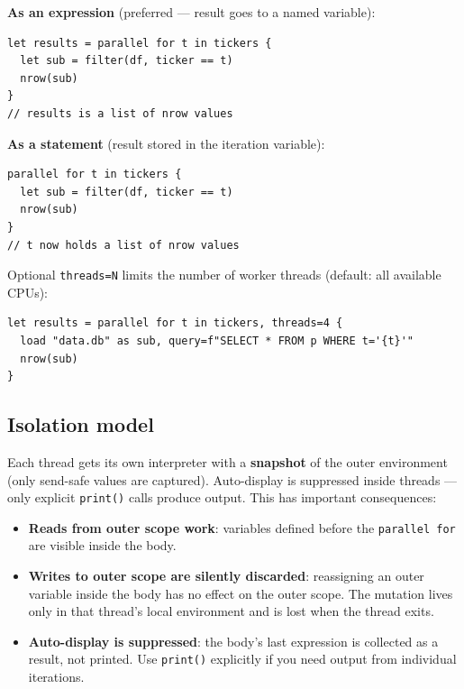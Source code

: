 \textbf{As an expression} (preferred --- result goes to a named variable):

\begin{lstlisting}[caption={parallel for as expression}]
let results = parallel for t in tickers {
  let sub = filter(df, ticker == t)
  nrow(sub)
}
// results is a list of nrow values
\end{lstlisting}

\textbf{As a statement} (result stored in the iteration variable):

\begin{lstlisting}[caption={parallel for as statement}]
parallel for t in tickers {
  let sub = filter(df, ticker == t)
  nrow(sub)
}
// t now holds a list of nrow values
\end{lstlisting}

Optional \texttt{threads=N} limits the number of worker threads
(default: all available CPUs):

\begin{lstlisting}[caption={Thread limit}]
let results = parallel for t in tickers, threads=4 {
  load "data.db" as sub, query=f"SELECT * FROM p WHERE t='{t}'"
  nrow(sub)
}
\end{lstlisting}

\subsection*{Isolation model}

Each thread gets its own interpreter with a \textbf{snapshot} of the
outer environment (only send-safe values are captured). Auto-display is
suppressed inside threads --- only explicit \texttt{print()} calls
produce output. This has important consequences:

\begin{itemize}
  \item \textbf{Reads from outer scope work}: variables defined before
    the \texttt{parallel for} are visible inside the body.
  \item \textbf{Writes to outer scope are silently discarded}:
    reassigning an outer variable inside the body has no effect on the
    outer scope. The mutation lives only in that thread's local
    environment and is lost when the thread exits.
  \item \textbf{Auto-display is suppressed}: the body's last expression
    is collected as a result, not printed. Use \texttt{print()}
    explicitly if you need output from individual iterations.
\end{itemize}

